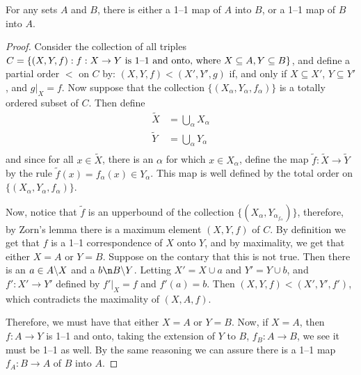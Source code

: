 \begin{theorem}\label{thm_3}
    For any sets $A$ and  $B$, there is either a 1--1 map of  $A$ into  $B$, or
    a 1--1 map of  $B$ into  $A$.
\end{theorem}
\begin{proof}
    Consider the collection of all triples $C=\{(X,Y,f) : f:X \rightarrow Y
    \text{ is 1--1 and onto, where }\\ X \subseteq A, Y \subseteq B\}$, and
    define a partial order $<$ on  $C$ by: $(X,Y,f)<(X',Y',g)$ if, and only if
    $X \subseteq X'$,  $Y \subseteq Y'$, and  $g|_X=f$. Now suppose that the
    collection  $\{(X_\alpha, Y_\alpha,f_\alpha)\}$ is a totally ordered subset
    of $C$. Then define
    \begin{align*}
        \tilde{X}   &=      \bigcup_{\alpha}{X_\alpha} \\
        \tilde{Y}   &=      \bigcup_{\alpha}{Y_\alpha} \\
    \end{align*}
    and since for all $x \in \tilde{X}$, there is an $\alpha$  for which $x \in
    X_\alpha$, define the map $\tilde{f}:\tilde{X} \rightarrow \tilde{Y}$ by the
    rule $\tilde{f}(x)=f_\alpha(x) \in Y_\alpha$. This map is well defined by
    the total order on $\{(X_\alpha,Y_\alpha,f_\alpha)\}$.

    Now, notice that $\tilde{f}$ is an upperbound of the collection
    $\{(X_\alpha,Y_\alpha_f_\alpha)\}$, therefore, by Zorn's lemma there is a
    maximum element $(X,Y,f)$ of $C$. By definition we get that $f$ is a 1--1
    correspondence of $X$ onto $Y$, and by maximality, we get that either $X=A$
    or $Y=B$. Suppose on the contary that this is not true. Then there is an  $a
    \in A\backslash X$ and a $b \n \com{B}{Y}$. Letting $X'=X \cup a$ and  $Y'=Y
    \cup b$, and  $f':X' \rightarrow Y'$ defined by $f'|_X=f$ and  $f'(a)=b$.
    Then $(X,Y,f)<(X',Y',f')$, which contradicts the maximality of $(X,A,f)$.

    Therefore, we must have that either $X=A$ or  $Y=B$. Now, if  $X=A$, then
    $f:A \rightarrow Y$ is 1--1 and onto, taking the extension of $Y$ to  $B$,
    $f_B:A \rightarrow B$, we see it must be 1--1 as well. By the same reasoning
    we can assure there is a 1--1 map $f_A:B \rightarrow A$ of $B$ into  $A$.
\end{proof}

